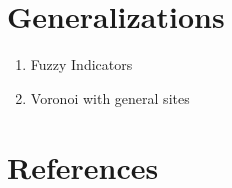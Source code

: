 \documentclass[
  12pt,
]{article}
\providecommand{\tightlist}{%
  \setlength{\itemsep}{0pt}\setlength{\parskip}{0pt}}
\begin{document}
\section{Generalizations}\label{generalizations}

\begin{enumerate}
\def\labelenumi{\arabic{enumi}.}
\tightlist
\item
  Fuzzy Indicators
\item
  Voronoi with general sites
\end{enumerate}

\section*{References}\label{references}
\end{document}
